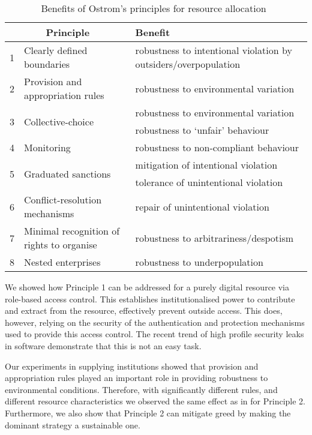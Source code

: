 \begin{table}[ht]
\centering
\caption[Benefits of Ostrom's principles for resource allocation]{Benefits of Ostrom's principles for resource allocation~\citep{Schaumeier2013}}\label{tab:principlebenefit}
\begin{tabularx}{\textwidth}{lp{4cm}X}
\multicolumn{2}{c}{Principle} & Benefit \\
\hline
1 & Clearly defined boundaries & robustness to intentional violation by outsiders/overpopulation \\
2 & Provision and appropriation rules & robustness to environmental variation \\
\multirow{2}{*}{3} & \multirow{2}{*}{Collective-choice} & robustness to environmental variation \\
 & & robustness to `unfair' behaviour \\
4 & Monitoring & robustness to non-compliant behaviour \\
\multirow{2}{*}{5} & \multirow{2}{*}{Graduated sanctions} & mitigation of intentional violation \\
 & & tolerance of unintentional violation \\
6 & Conflict-resolution mechanisms & repair of unintentional violation \\
7 & Minimal recognition of rights to organise & robustness to arbitrariness/despotism \\
8 & Nested enterprises & robustness to underpopulation \\
\end{tabularx}
\end{table}

We showed how Principle 1 can be addressed for a purely digital resource via
role-based access control. This establishes institutionalised power to
contribute and extract from the resource, effectively prevent outside access.
This does, however, relying on the security of the authentication and
protection mechanisms used to provide this access control. The recent trend of
high profile security leaks in software demonstrate that this is not an easy
task.

Our experiments in supplying institutions showed that provision and
appropriation rules played an important role in providing robustness to
environmental conditions. Therefore, with significantly different rules, and
different resource characteristics we observed the same effect as in
\citet{Pitt2012b} for Principle 2. Furthermore, we also show that Principle 2
can mitigate greed by making the dominant strategy a sustainable one.

